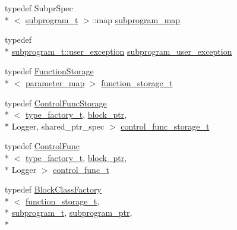\begin{DoxyCompactItemize}
\item 
typedef Subpr\-Spec\\*
$<$ \hyperlink{structLIBKMS__namespace_1_1class__spec_a145748a703c1c753bce703ced41fc506}{subprogram\-\_\-t} $>$\-::map \hyperlink{structLIBKMS__namespace_1_1class__spec_a993880da2cc74bfdc8342f5bb95ed137}{subprogram\-\_\-map}
\item 
typedef \\*
\hyperlink{structLIBKMS__namespace_1_1Subprogram_1_1user__exception}{subprogram\-\_\-t\-::user\-\_\-exception} \hyperlink{structLIBKMS__namespace_1_1class__spec_a7057878a7ac2cfcbdd6de37112e61b61}{subprogram\-\_\-user\-\_\-exception}
\item 
typedef \hyperlink{classLIBKMS__namespace_1_1FunctionStorage}{Function\-Storage}\\*
$<$ \hyperlink{structLIBKMS__namespace_1_1class__spec_a084ce0bd5bd9ead6059b0e35d04a4785}{parameter\-\_\-map} $>$ \hyperlink{structLIBKMS__namespace_1_1class__spec_a9dfd29f88c6c529d8825656ab6753705}{function\-\_\-storage\-\_\-t}
\item 
typedef \hyperlink{classLIBKMS__namespace_1_1ControlFuncStorage}{Control\-Func\-Storage}\\*
$<$ \hyperlink{structLIBKMS__namespace_1_1class__spec_a2abf5149a27867873b0c0463c3bb376b}{type\-\_\-factory\-\_\-t}, \hyperlink{structLIBKMS__namespace_1_1class__spec_acbfd7c07aa4238536acc8d1ee3bca661}{block\-\_\-ptr}, \\*
Logger, shared\-\_\-ptr\-\_\-spec $>$ \hyperlink{structLIBKMS__namespace_1_1class__spec_a5cb0cc1e0bff99b617532ddba6b38ffb}{control\-\_\-func\-\_\-storage\-\_\-t}
\item 
typedef \hyperlink{classLIBKMS__namespace_1_1ControlFunc}{Control\-Func}\\*
$<$ \hyperlink{structLIBKMS__namespace_1_1class__spec_a2abf5149a27867873b0c0463c3bb376b}{type\-\_\-factory\-\_\-t}, \hyperlink{structLIBKMS__namespace_1_1class__spec_acbfd7c07aa4238536acc8d1ee3bca661}{block\-\_\-ptr}, \\*
Logger $>$ \hyperlink{structLIBKMS__namespace_1_1class__spec_ab4ea80b19ce84b2522d8808bc3448c38}{control\-\_\-func\-\_\-t}
\item 
typedef \hyperlink{classLIBKMS__namespace_1_1BlockClassFactory}{Block\-Class\-Factory}\\*
$<$ \hyperlink{structLIBKMS__namespace_1_1class__spec_a9dfd29f88c6c529d8825656ab6753705}{function\-\_\-storage\-\_\-t}, \\*
\hyperlink{structLIBKMS__namespace_1_1class__spec_a145748a703c1c753bce703ced41fc506}{subprogram\-\_\-t}, \hyperlink{structLIBKMS__namespace_1_1class__spec_a4b3f90a3ca3d3b067ea8514815908320}{subprogram\-\_\-ptr}, \\*

\end{DoxyCompactItemize}
